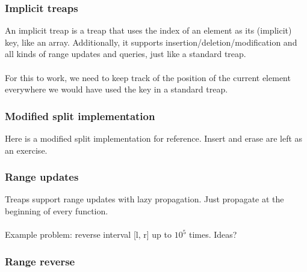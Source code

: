 \begin{frame}
	\frametitle{Implicit treaps}

	An implicit treap is a treap that uses the index of an element as its (implicit) key, like an array. Additionally, it supports insertion/deletion/modification and all kinds of range updates and queries, just like a standard treap. \\~\\
	For this to work, we need to keep track of the position of the current element everywhere we would have used the key in a standard treap.
\end{frame}

\begin{frame}
	\frametitle{Modified split implementation}

	Here is a modified split implementation for reference. Insert and erase are left as an exercise.

	\begin{center}
		
	\end{center}
\end{frame}

\begin{frame}
	\frametitle{Range updates}

	Treaps support range updates with lazy propagation. Just propagate at the beginning of every function. \\~\\
	Example problem: reverse interval [l, r] up to $10^5$ times. Ideas?
\end{frame}

\begin{frame}
	\frametitle{Range reverse}
	
	\begin{center}
		
	\end{center}
\end{frame}


